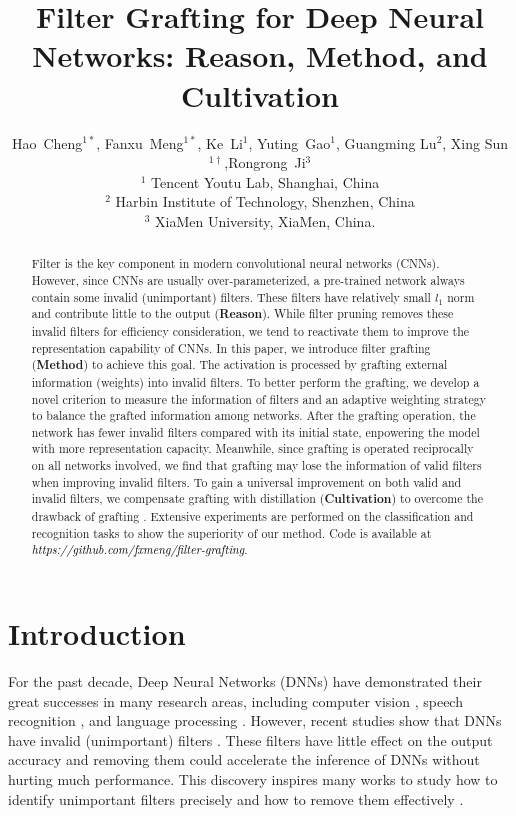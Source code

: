\documentclass{article}
\title{Filter Grafting for Deep Neural Networks: Reason, Method, and Cultivation}
\author{Hao~Cheng$^{1*}$, Fanxu~Meng$^{1*}$,  Ke~Li$^1$, Yuting~Gao$^1$, Guangming Lu$^{2}$, Xing Sun$^{1\dagger}$,Rongrong~Ji$^{3}$\\ 
	$^1$ Tencent Youtu Lab, Shanghai, China \\
	$^2$ Harbin Institute of Technology, Shenzhen, China\\		
	$^3$ XiaMen University, XiaMen, China.\\	
}
\begin{document}
\maketitle
\begin{abstract}
	Filter is the key component in modern convolutional neural networks (CNNs). However, since CNNs are usually over-parameterized, a pre-trained network always contain some invalid (unimportant) filters. These filters have relatively small $l_{1}$ norm and contribute little to the output (\textbf{Reason}). While filter pruning removes these invalid filters for efficiency consideration, we tend to reactivate them to improve the representation capability of CNNs. In this paper, we introduce filter grafting (\textbf{Method}) to achieve this goal. The activation is processed by grafting external information (weights) into invalid filters. To better perform the grafting, we develop a novel criterion to measure the information of filters and an adaptive weighting strategy to balance the grafted information among networks. After the grafting operation, the network has fewer invalid filters compared with its initial state, enpowering the model with more representation capacity. Meanwhile, since grafting is operated reciprocally on all networks involved, we find that grafting may lose the information of valid filters when improving invalid filters. 
	To gain a universal improvement on both valid and invalid filters, we compensate grafting with distillation (\textbf{Cultivation}) to overcome the drawback of grafting . Extensive experiments are performed on the classification and recognition tasks to show the superiority of our method. Code is available at \textcolor{black}{\emph{https://github.com/fxmeng/filter-grafting}}.
\end{abstract}


\section{Introduction}
For the past decade, Deep Neural Networks (DNNs) have demonstrated their great successes in many research areas, including computer vision \cite{krizhevsky2012imagenet,lotter2016deep}, speech recognition \cite{graves2013speech}, and language processing \cite{zhang2015text}. However, recent studies show that DNNs have invalid (unimportant) filters \cite{li2016pruning}. These filters have little effect on the output accuracy and removing them could accelerate the inference of DNNs without hurting much performance. This discovery inspires many works to study how to identify unimportant filters precisely \cite{molchanov2019importance} and how to remove them effectively \cite{suau2018principal,lin2018holistic}. 
\end{document}
